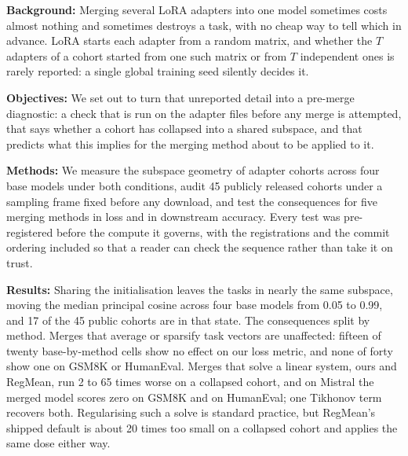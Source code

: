 %
%

{\bf Background:}
Merging several LoRA adapters into one model sometimes costs almost nothing
and sometimes destroys a task, with no cheap way to tell which in advance.
LoRA starts each adapter from a random matrix, and whether the $T$ adapters of
a cohort started from one such matrix or from $T$ independent ones is rarely
reported: a single global training seed silently decides it.

{\bf Objectives:}
We set out to turn that unreported detail into a pre-merge diagnostic: a check
that is run on the adapter files before any merge is attempted, that says
whether a cohort has collapsed into a shared subspace, and that predicts what
this implies for the merging method about to be applied to it.

{\bf Methods:}
We measure the subspace geometry of adapter cohorts across four base models
under both conditions, audit 45 publicly released cohorts under a sampling
frame fixed before any download, and test the consequences for five merging
methods in loss and in downstream accuracy. Every test was pre-registered
before the compute it governs, with the registrations and the commit ordering
included so that a reader can check the sequence rather than take it on trust.

{\bf Results:}
Sharing the initialisation leaves the tasks in nearly the same subspace,
moving the median principal cosine across four base models from 0.05 to 0.99,
and 17 of the 45 public cohorts are in that state. The consequences split by
method. Merges that average or sparsify task vectors are unaffected: fifteen
of twenty base-by-method cells show no effect on our loss metric, and none of
forty show one on GSM8K or HumanEval. Merges that solve a linear system, ours
and RegMean, run 2 to 65 times worse on a collapsed cohort, and on Mistral the
merged model scores zero on GSM8K and on HumanEval; one Tikhonov term recovers
both. Regularising such a solve is standard practice, but RegMean's shipped
default is about 20 times too small on a collapsed cohort and applies the same
dose either way.

